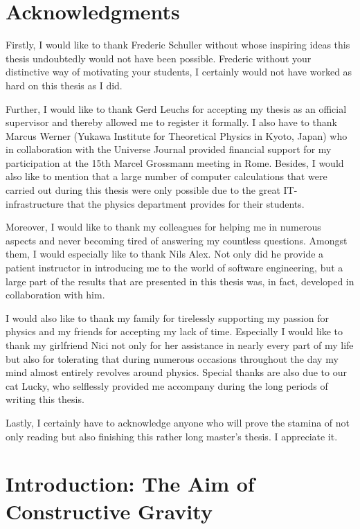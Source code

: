 \documentclass[a4paper,12pt, DIV=14, BCOR=5mm, twoside, headsepline, numbers=noenddot]{scrbook}
\begin{document}
\chapter*{Acknowledgments}
Firstly, I would like to thank Frederic Schuller without whose inspiring ideas this thesis undoubtedly would not have been possible. Frederic without your distinctive way of motivating your students, I certainly would not have worked as hard on this thesis as I did.

Further, I would like to thank Gerd Leuchs for accepting my thesis as an official supervisor and thereby allowed me to register it formally. 
I also have to thank Marcus Werner (Yukawa Institute for Theoretical Physics in Kyoto, Japan) who in collaboration with the Universe Journal provided financial support for my participation at the 15th Marcel Grossmann meeting in Rome. 
Besides, I would also like to mention that a large number of computer calculations that were carried out during this thesis were only possible due to the great IT-infrastructure that the physics department provides for their students. 


Moreover, I would like to thank my colleagues for helping me in numerous aspects and never becoming tired of answering my countless questions.
Amongst them, I would especially like to thank Nils Alex.
Not only did he provide a patient instructor in introducing me to the world of software engineering, 
but a large part of the results that are presented in this thesis was, in fact, developed in collaboration with him. 


I would also like to thank my family for tirelessly supporting my passion for physics and my friends for accepting my lack of time.
Especially I would like to thank my girlfriend Nici not only for her assistance in nearly every part of my life but also
for tolerating that during numerous occasions throughout the day my mind almost entirely revolves around physics. 
Special thanks are also due to our cat Lucky, who selflessly provided me accompany during the long periods of writing this thesis. 

Lastly, I certainly have to acknowledge anyone who will prove the stamina of not only reading but also finishing this rather long master's thesis. I appreciate it. 

\mainmatter

\chapter{Introduction: The Aim of Constructive Gravity}

\end{document}
